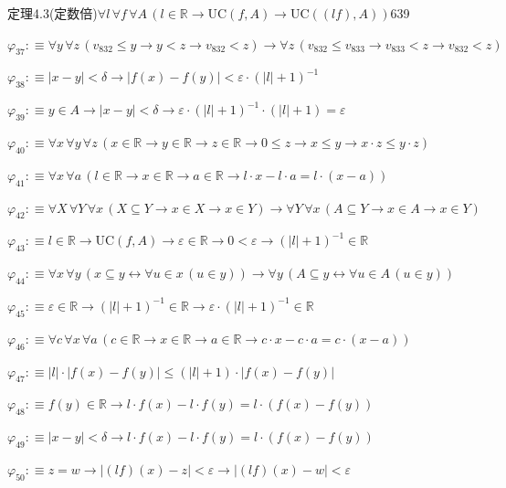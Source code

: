 \begin{fullproof}{定理4.3(定数倍)}{$\forall l\,\forall f\,\forall A\,(l \in \mathbb{R} \to \mathrm{UC}(f,A) \to \mathrm{UC}((l f),A))$}{639}
\begin{abbrevlist}
\item $\varphi_{37} :\equiv \forall y\,\forall z\,(v_{832} \leq y \to y < z \to v_{832} < z) \to \forall z\,(v_{832} \leq v_{833} \to v_{833} < z \to v_{832} < z)$
\item $\varphi_{38} :\equiv \lvert x - y \rvert < \delta \to \lvert f(x) - f(y) \rvert < \varepsilon \cdot (\lvert l \rvert + 1)^{-1}$
\item $\varphi_{39} :\equiv y \in A \to \lvert x - y \rvert < \delta \to \varepsilon \cdot (\lvert l \rvert + 1)^{-1} \cdot (\lvert l \rvert + 1) = \varepsilon$
\item $\varphi_{40} :\equiv \forall x\,\forall y\,\forall z\,(x \in \mathbb{R} \to y \in \mathbb{R} \to z \in \mathbb{R} \to 0 \leq z \to x \leq y \to x \cdot z \leq y \cdot z)$
\item $\varphi_{41} :\equiv \forall x\,\forall a\,(l \in \mathbb{R} \to x \in \mathbb{R} \to a \in \mathbb{R} \to l \cdot x - l \cdot a = l \cdot (x - a))$
\item $\varphi_{42} :\equiv \forall X\,\forall Y\,\forall x\,(X \subseteq Y \to x \in X \to x \in Y) \to \forall Y\,\forall x\,(A \subseteq Y \to x \in A \to x \in Y)$
\item $\varphi_{43} :\equiv l \in \mathbb{R} \to \mathrm{UC}(f,A) \to \varepsilon \in \mathbb{R} \to 0 < \varepsilon \to (\lvert l \rvert + 1)^{-1} \in \mathbb{R}$
\item $\varphi_{44} :\equiv \forall x\,\forall y\,(x \subseteq y \leftrightarrow \forall u \in x\,(u \in y)) \to \forall y\,(A \subseteq y \leftrightarrow \forall u \in A\,(u \in y))$
\item $\varphi_{45} :\equiv \varepsilon \in \mathbb{R} \to (\lvert l \rvert + 1)^{-1} \in \mathbb{R} \to \varepsilon \cdot (\lvert l \rvert + 1)^{-1} \in \mathbb{R}$
\item $\varphi_{46} :\equiv \forall c\,\forall x\,\forall a\,(c \in \mathbb{R} \to x \in \mathbb{R} \to a \in \mathbb{R} \to c \cdot x - c \cdot a = c \cdot (x - a))$
\item $\varphi_{47} :\equiv \lvert l \rvert \cdot \lvert f(x) - f(y) \rvert \leq (\lvert l \rvert + 1) \cdot \lvert f(x) - f(y) \rvert$
\item $\varphi_{48} :\equiv f(y) \in \mathbb{R} \to l \cdot f(x) - l \cdot f(y) = l \cdot (f(x) - f(y))$
\item $\varphi_{49} :\equiv \lvert x - y \rvert < \delta \to l \cdot f(x) - l \cdot f(y) = l \cdot (f(x) - f(y))$
\item $\varphi_{50} :\equiv z = w \to \lvert (l f)(x) - z \rvert < \varepsilon \to \lvert (l f)(x) - w \rvert < \varepsilon$

\end{abbrevlist}
\end{fullproof}
